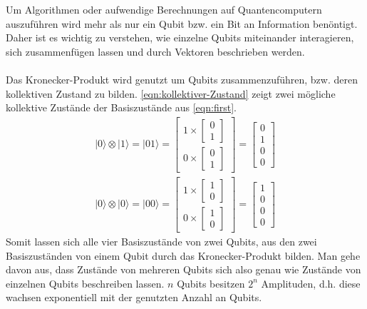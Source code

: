 Um Algorithmen oder aufwendige Berechnungen auf Quantencomputern auszuf\"uhren wird mehr als nur ein Qubit bzw. ein Bit an Information ben\"ontigt. Daher ist es wichtig zu verstehen, wie einzelne Qubits miteinander interagieren, sich zusammenf\"ugen lassen und durch Vektoren beschrieben werden. \\\\
Das Kronecker-Produkt wird genutzt um Qubits zusammenzuf\"uhren, bzw. deren kollektiven Zustand zu bilden. \ref{eqn:kollektiver-Zustand} zeigt zwei m\"ogliche kollektive Zust\"ande der Basiszust\"ande aus \ref{eqn:first}.
\begin{equation}\label{eqn:kollektiver-Zustand}
\begin{aligned}
  |0\rangle\otimes |1\rangle = |01\rangle = \begin{bmatrix}1 \times \begin{bmatrix} 0\\1\end{bmatrix}\\[1em] 0 \times \begin{bmatrix} 0\\1\end{bmatrix}\end{bmatrix} = \begin{bmatrix} 0 \\ 1 \\ 0 \\ 0\end{bmatrix} \\[1em]
  |0\rangle\otimes |0\rangle = |00\rangle = \begin{bmatrix}1 \times \begin{bmatrix} 1\\0\end{bmatrix}\\[1em] 0 \times \begin{bmatrix} 1\\0\end{bmatrix}\end{bmatrix} = \begin{bmatrix} 1 \\ 0 \\ 0 \\ 0\end{bmatrix}
\end{aligned}
\end{equation}
Somit lassen sich alle vier Basiszust\"ande von zwei Qubits, aus den zwei Basiszust\"anden von einem Qubit durch das Kronecker-Produkt bilden.
Man gehe davon aus, dass Zust\"ande von mehreren Qubits sich also genau wie Zust\"ande von einzelnen Qubits beschreiben lassen. $n$ Qubits besitzen $2^n$ Amplituden, d.h. diese wachsen exponentiell mit der genutzten Anzahl an Qubits.
